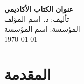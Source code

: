 \documentclass[10pt,oneside,a4paper]{book}
\begin{document}
\begin{titlepage}
    \centering
    {\Large\textbf{عنوان الكتاب الأكاديمي}}\\[2cm]
    {\large تأليف: د. اسم المؤلف}\\[1cm]
    {\large المؤسسة: اسم المؤسسة}\\[2cm]
    \vfill
    {\large \today}
\end{titlepage}

\frontmatter

\tableofcontents



\mainmatter

\chapter*{المقدمة}






\appendix



\printglossaries



\end{document}
